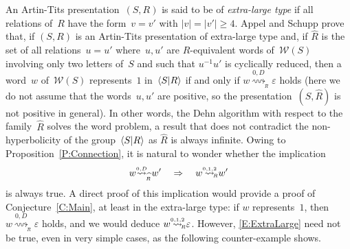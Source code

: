 \documentclass{amsart}
\numberwithin{equation}{section}
\theoremstyle{plain}
\theoremstyle{definition}
\let\ge=\geqslant
\begin{document}
An Artin-Tits presentation~$({S},{R})$ is said to be of \emph{extra-large type} if all relations of~${R}$ have the form~${v} = {v}'$ with ${\vert{v}\vert} = {\vert{{v}'}\vert} \ge 4$. Appel and Schupp \cite{ApS} prove that, if $({S},{R})$ is an Artin-Tits presentation of extra-large type and, if ${\widehat{R}}$ is the set of all relations~${u} = {u}'$ where~${u}, {u}'$ are ${R}$-equivalent words of~${\mathcal{W}({S})}$ involving only two letters of~${S}$ and such that ${u}{^{-1}} {u}'$ is cyclically reduced, then a word~${w}$ of~${\mathcal{W}({S})}$ represents~$1$ in~${\langle{S}{\mid}\nobreak{R}\rangle}$ if and only if ${w} {\mathrel{{\mathrel{\overset{\scriptscriptstyle 0,D}{\rightsquigarrow}}}_{\widehat{{\!{}_{R}}}}}} {\varepsilon}$ holds (here we do not assume that the words~${u}, {u}'$ are positive, so the presentation~$({S}, {\widehat{R}})$ is not positive in general). In other words, the Dehn algorithm with respect to the family~${\widehat{R}}$ solves the word problem, a result that does not contradict the non-hyperbolicity of the group~${\langle{S}{\mid}\nobreak{R}\rangle}$ as ${\widehat{R}}$ is always infinite. Owing to Proposition~\ref{P:Connection}, it is natural to wonder whether the implication
\begin{equation}
\label{E:ExtraLarge}
{w} {\mathrel{{\mathrel{\overset{\scriptscriptstyle 0,D}{\rightsquigarrow}}}_{\widehat{{\!{}_{R}}}}}} {w}' \quad \Rightarrow \quad {w} {\mathrel{{\mathrel{\overset{\scriptscriptstyle 0,1,2}{\rightsquigarrow}}}_{\hspace{-0.9ex}{\scriptscriptstyle R}}}} {w}'
\end{equation}
is always true. A direct proof of this implication would provide a proof of Conjecture~\ref{C:Main}, at least in the extra-large type: if ${w}$ represents~$1$, then ${w} {\mathrel{{\mathrel{\overset{\scriptscriptstyle 0,D}{\rightsquigarrow}}}_{\widehat{{\!{}_{R}}}}}} {\varepsilon}$ holds, and we would deduce ${w} {\mathrel{{\mathrel{\overset{\scriptscriptstyle 0,1,2}{\rightsquigarrow}}}_{\hspace{-0.9ex}{\scriptscriptstyle R}}}} {\varepsilon}$. However, \eqref{E:ExtraLarge} need not be true, even in very simple cases, as the following counter-example shows.
\end{document}
